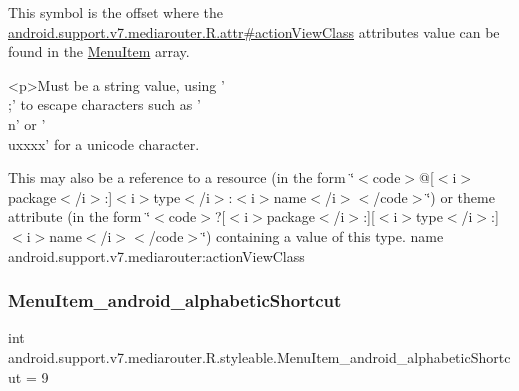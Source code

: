 This symbol is the offset where the \hyperlink{classandroid_1_1support_1_1v7_1_1mediarouter_1_1R_1_1attr_af8eed0b01f027fc67250ad2531e80b95}{android.\+support.\+v7.\+mediarouter.\+R.\+attr\#action\+View\+Class} attribute\textquotesingle{}s value can be found in the \hyperlink{classandroid_1_1support_1_1v7_1_1mediarouter_1_1R_1_1styleable_ab3f2d4af0d17a47efacf7fd82df9528d}{Menu\+Item} array.

\begin{DoxyVerb}      <p>Must be a string value, using '\\;' to escape characters such as '\\n' or '\\uxxxx' for a unicode character.
\end{DoxyVerb}
 

This may also be a reference to a resource (in the form \char`\"{}$<$code$>$@\mbox{[}$<$i$>$package$<$/i$>$\+:\mbox{]}$<$i$>$type$<$/i$>$\+:$<$i$>$name$<$/i$>$$<$/code$>$\char`\"{}) or theme attribute (in the form \char`\"{}$<$code$>$?\mbox{[}$<$i$>$package$<$/i$>$\+:\mbox{]}\mbox{[}$<$i$>$type$<$/i$>$\+:\mbox{]}$<$i$>$name$<$/i$>$$<$/code$>$\char`\"{}) containing a value of this type.  name android.\+support.\+v7.\+mediarouter\+:action\+View\+Class \mbox{\label{classandroid_1_1support_1_1v7_1_1mediarouter_1_1R_1_1styleable_a8ac2af9738b8960cf827ec83b5170112}} 
\subsubsection{\texorpdfstring{Menu\+Item\+\_\+android\+\_\+alphabetic\+Shortcut}{MenuItem\_android\_alphabeticShortcut}}
{\footnotesize\ttfamily int android.\+support.\+v7.\+mediarouter.\+R.\+styleable.\+Menu\+Item\+\_\+android\+\_\+alphabetic\+Shortcut = 9\hspace{0.3cm}{\ttfamily [static]}}

